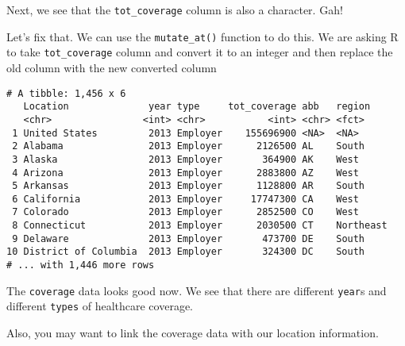 \documentclass[]{article}
\newenvironment{Shaded}{\begin{snugshade}}{\end{snugshade}}
\newcommand{\CommentTok}[1]{\textcolor[rgb]{0.56,0.35,0.01}{\textit{#1}}}
\newcommand{\KeywordTok}[1]{\textcolor[rgb]{0.13,0.29,0.53}{\textbf{#1}}}
\newcommand{\NormalTok}[1]{#1}
\newcommand{\OperatorTok}[1]{\textcolor[rgb]{0.81,0.36,0.00}{\textbf{#1}}}
\newcommand{\StringTok}[1]{\textcolor[rgb]{0.31,0.60,0.02}{#1}}
\begin{document}
Next, we see that the \texttt{tot\_coverage} column is also a character.
Gah!

Let's fix that. We can use the \texttt{mutate\_at()} function to do
this. We are asking R to take \texttt{tot\_coverage} column and convert
it to an integer and then replace the old column with the new converted
column

\begin{Shaded}
\end{Shaded}

\begin{verbatim}
# A tibble: 1,456 x 6
   Location              year type     tot_coverage abb   region   
   <chr>                <int> <chr>           <int> <chr> <fct>    
 1 United States         2013 Employer    155696900 <NA>  <NA>     
 2 Alabama               2013 Employer      2126500 AL    South    
 3 Alaska                2013 Employer       364900 AK    West     
 4 Arizona               2013 Employer      2883800 AZ    West     
 5 Arkansas              2013 Employer      1128800 AR    South    
 6 California            2013 Employer     17747300 CA    West     
 7 Colorado              2013 Employer      2852500 CO    West     
 8 Connecticut           2013 Employer      2030500 CT    Northeast
 9 Delaware              2013 Employer       473700 DE    South    
10 District of Columbia  2013 Employer       324300 DC    South    
# ... with 1,446 more rows
\end{verbatim}

The \texttt{coverage} data looks good now. We see that there are
different \texttt{year}s and different \texttt{types} of healthcare
coverage.

Also, you may want to link the coverage data with our location
information.
\end{document}
